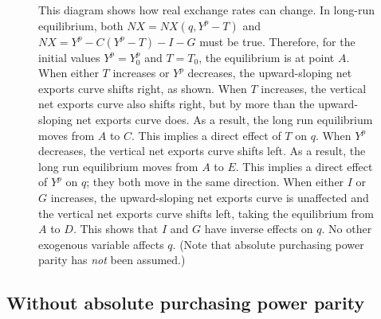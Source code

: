 \documentclass[
  letterpaper,
]{book}
\theoremstyle{plain}
\theoremstyle{remark}
\begin{document}
\begin{figure}


\caption{\label{fig-NX_real_exch_rate_LR_eqm}This diagram shows how real
exchange rates can change. In long-run equilibrium, both
\(NX=NX(q,Y^p-T)\) and \(NX=Y^p-C(Y^p-T)-I-G\) must be true. Therefore,
for the initial values \(Y^p=Y^p_0\) and \(T=T_0\), the equilibrium is
at point \(A\). When either \(T\) increases or \(Y^p\) decreases, the
upward-sloping net exports curve shifts right, as shown. When \(T\)
increases, the vertical net exports curve also shifts right, but by more
than the upward-sloping net exports curve does. As a result, the long
run equilibrium moves from \(A\) to \(C\). This implies a direct effect
of \(T\) on \(q\). When \(Y^p\) decreases, the vertical net exports
curve shifts left. As a result, the long run equilibrium moves from
\(A\) to \(E\). This implies a direct effect of \(Y^p\) on \(q\); they
both move in the same direction. When either \(I\) or \(G\) increases,
the upward-sloping net exports curve is unaffected and the vertical net
exports curve shifts left, taking the equilibrium from \(A\) to \(D\).
This shows that \(I\) and \(G\) have inverse effects on \(q\). No other
exogenous variable affects \(q\). (Note that absolute purchasing power
parity has \emph{not} been assumed.)}

\end{figure}%

\subsection{Without absolute purchasing power
parity}\label{sec-q-long-no-appp}
\end{document}
